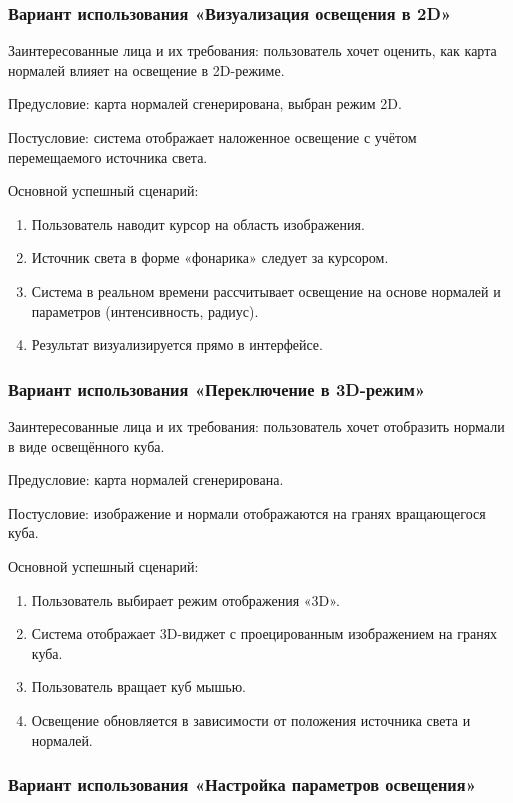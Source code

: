 \subsubsection{Вариант использования «Визуализация освещения в 2D»}

Заинтересованные лица и их требования: пользователь хочет оценить, как карта нормалей влияет на освещение в 2D-режиме.

Предусловие: карта нормалей сгенерирована, выбран режим 2D.

Постусловие: система отображает наложенное освещение с учётом перемещаемого источника света.

Основной успешный сценарий:
\begin{enumerate}
	\item Пользователь наводит курсор на область изображения.
	\item Источник света в форме «фонарика» следует за курсором.
	\item Система в реальном времени рассчитывает освещение на основе нормалей и параметров (интенсивность, радиус).
	\item Результат визуализируется прямо в интерфейсе.
\end{enumerate}
\subsubsection{Вариант использования «Переключение в 3D-режим»}

Заинтересованные лица и их требования: пользователь хочет отобразить нормали в виде освещённого куба.

Предусловие: карта нормалей сгенерирована.

Постусловие: изображение и нормали отображаются на гранях вращающегося куба.

Основной успешный сценарий:
\begin{enumerate}
	\item Пользователь выбирает режим отображения «3D».
	\item Система отображает 3D-виджет с проецированным изображением на гранях куба.
	\item Пользователь вращает куб мышью.
	\item Освещение обновляется в зависимости от положения источника света и нормалей.
\end{enumerate}
\subsubsection{Вариант использования «Настройка параметров освещения»}

